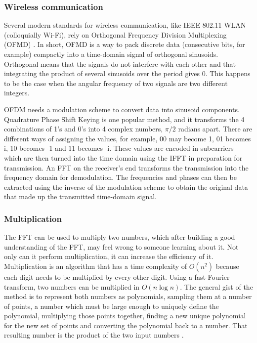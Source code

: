 \subsubsection{Wireless communication}
Several modern standards for wireless communication, like IEEE 802.11 WLAN (colloquially Wi-Fi), rely on Orthogonal Frequency Division Multiplexing (OFMD) \cite{GnanishivaramNeeraja2014}. In short, OFMD is a way to pack discrete data (consecutive bits, for example) compactly into a time-domain signal of orthogonal sinusoids. Orthogonal means that the signals do not interfere with each other and that integrating the product of several sinusoids over the period gives 0. This happens to be the case when the angular frequency of two signals are two different integers. 

OFDM needs a modulation scheme to convert data into sinusoid components. Quadrature Phase Shift Keying is one popular method, and it transforms the 4 combinations of 1's and 0's into 4 complex numbers, $\pi/2$ radians apart. There are different ways of assigning the values, for example, 00 may become 1, 01 becomes i, 10 becomes -1 and 11 becomes -i. These values are encoded in subcarriers which are then turned into the time domain using the IFFT in preparation for transmission. An FFT on the receiver's end transforms the transmission into the frequency domain for demodulation. The frequencies and phases can then be extracted using the inverse of the modulation scheme to obtain the original data that made up the transmitted time-domain signal.

\subsubsection{Multiplication}
The FFT can be used to multiply two numbers, which after building a good understanding of the FFT, may feel wrong to someone learning about it. Not only can it perform multiplication, it can increase the efficiency of it. Multiplication is an algorithm that has a time complexity of $O(n^2)$ because each digit needs to be multiplied by every other digit. Using a fast Fourier transform, two numbers can be multiplied in $O(n \log n)$. The general gist of the method is to represent both numbers as polynomials, sampling them at a number of points, a number which must be large enough to uniquely define the polynomial, multiplying those points together, finding a new unique polynomial for the new set of points and converting the polynomial back to a number. That resulting number is the product of the two input numbers \cite{Reducible2020}.

